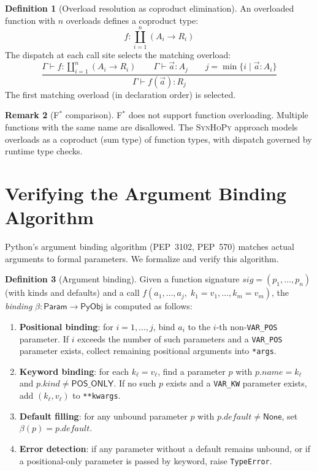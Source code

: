 \documentclass[11pt,a4paper]{report}
\theoremstyle{definition}
\newtheorem{definition}{Definition}[chapter]
\newtheorem{remark}[definition]{Remark}
\theoremstyle{plain}
\newcommand{\PyObj}{\mathsf{PyObj}}
\newcommand{\PyNone}{\mathsf{None}}
\newcommand{\fstar}{F$^{*}$}
\newcommand{\synhopy}{\textsc{SynHoPy}}
\begin{document}
\begin{definition}[Overload resolution as coproduct elimination]
\label{def:overload-variadic}
An overloaded function with $n$ overloads defines a coproduct type:
\[
  f : \coprod_{i=1}^{n} (A_i \to R_i)
\]
The dispatch at each call site selects the matching overload:
\[
  \frac{
    \Gamma \vdash f : \coprod_{i=1}^{n} (A_i \to R_i) \qquad
    \Gamma \vdash \vec{a} : A_j \qquad
    j = \min\{i \mid \vec{a} : A_i\}
  }{
    \Gamma \vdash f(\vec{a}) : R_j
  }
\]
The first matching overload (in declaration order) is selected.
\end{definition}

\begin{remark}[\fstar{} comparison]
\fstar{} does not support function overloading.  Multiple functions with
the same name are disallowed.  The \synhopy{} approach models overloads
as a coproduct (sum type) of function types, with dispatch governed by
runtime type checks.
\end{remark}

\section{Verifying the Argument Binding Algorithm}

Python's argument binding algorithm (PEP~3102, PEP~570) matches actual
arguments to formal parameters.  We formalize and verify this algorithm.

\begin{definition}[Argument binding]
\label{def:arg-binding}
Given a function signature
$\mathit{sig} = (p_1, \ldots, p_n)$ (with kinds and defaults) and a call
$f(a_1, \ldots, a_j,\; k_1\!=\!v_1, \ldots, k_m\!=\!v_m)$,
the \emph{binding} $\beta : \mathsf{Param} \to \PyObj$ is computed as follows:
\begin{enumerate}
  \item \textbf{Positional binding}: for $i = 1, \ldots, j$, bind $a_i$ to the
    $i$-th non-\texttt{VAR\_POS} parameter.  If $i$ exceeds the number of
    such parameters and a \texttt{VAR\_POS} parameter exists, collect
    remaining positional arguments into \texttt{*args}.
  \item \textbf{Keyword binding}: for each $k_\ell = v_\ell$, find a parameter
    $p$ with $p.\mathit{name} = k_\ell$ and $p.\mathit{kind} \neq
    \mathsf{POS\_ONLY}$.  If no such $p$ exists and a \texttt{VAR\_KW}
    parameter exists, add $(k_\ell, v_\ell)$ to \texttt{**kwargs}.
  \item \textbf{Default filling}: for any unbound parameter $p$ with
    $p.\mathit{default} \neq \PyNone$, set $\beta(p) = p.\mathit{default}$.
  \item \textbf{Error detection}: if any parameter without a default remains
    unbound, or if a positional-only parameter is passed by keyword, raise
    \lstinline[style=python]{TypeError}.
\end{enumerate}
\end{definition}
\end{document}
